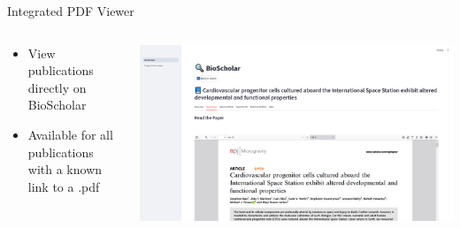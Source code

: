 \documentclass[t,aspectratio=169]{beamer}
\begin{document}
\begin{frame}{Integrated PDF Viewer}
	\begin{columns}[T]
		\begin{column}{.38\textwidth}
            \begin{itemize}
                \item View publications directly on BioScholar
                \item Available for all publications with a known link to a .pdf
            \end{itemize}
        \end{column}
		\begin{column}{.58\textwidth}
            \includegraphics[width=\textwidth]{images/5_integrated_viewer.png}
        \end{column}
    \end{columns}
\end{frame}
\end{document}
